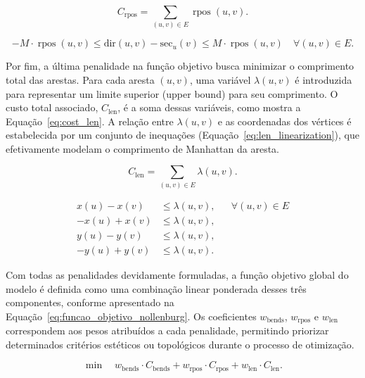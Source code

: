 \documentclass[cic,tc]{infufrgs}
\DeclareMathOperator{\rpos}{rpos}
\begin{document}
\begin{equation}
C_{\text{rpos}} = \sum_{(u,v) \in E} \rpos(u, v).
\label{eq:cost_rpos}
\end{equation}

\begin{equation}
-M \cdot \rpos(u,v) \le \text{dir}(u, v) - \text{sec}_u(v) \le M \cdot \rpos(u,v) \quad \forall (u, v) \in E.
\label{eq:rpos_linearization}
\end{equation}
 
Por fim, a última penalidade na função objetivo busca minimizar o comprimento total das arestas. Para cada aresta $(u,v)$, uma variável $\lambda(u,v)$ é introduzida para representar um limite superior (upper bound) para seu comprimento. O custo total associado, $C_{\text{len}}$, é a soma dessas variáveis, como mostra a Equação~\ref{eq:cost_len}. A relação entre $\lambda(u,v)$ e as coordenadas dos vértices é estabelecida por um conjunto de inequações (Equação~\ref{eq:len_linearization}), que efetivamente modelam o comprimento de Manhattan da aresta.

\begin{equation}
C_{\text{len}} = \sum_{(u,v) \in E} \lambda(u, v).
\label{eq:cost_len}
\end{equation}

\begin{align}
x(u) - x(v) &\le \lambda(u,v), && \forall (u, v) \in E \label{eq:len_linearization} \\
-x(u) + x(v) &\le \lambda(u,v), \nonumber \\
y(u) - y(v) &\le \lambda(u,v), \nonumber \\
-y(u) + y(v) &\le \lambda(u,v). \nonumber
\end{align}

Com todas as penalidades devidamente formuladas, a função objetivo global do modelo é definida como uma combinação linear ponderada desses três componentes, conforme apresentado na Equação~\ref{eq:funcao_objetivo_nollenburg}. Os coeficientes $w_{\text{bends}}$, $w_{\text{rpos}}$ e $w_{\text{len}}$ correspondem aos pesos atribuídos a cada penalidade, permitindo priorizar determinados critérios estéticos ou topológicos durante o processo de otimização.

\begin{equation}
\min \quad w_{\text{bends}} \cdot C_{\text{bends}} + w_{\text{rpos}} \cdot C_{\text{rpos}} + w_{\text{len}} \cdot C_{\text{len}}.
\label{eq:funcao_objetivo_nollenburg}
\end{equation}
 
\end{document}
